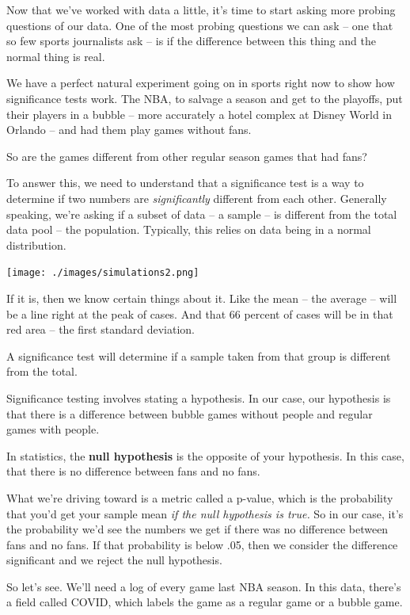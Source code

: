 \documentclass[
  letterpaper,
  DIV=11,
  numbers=noendperiod]{scrreprt}
\begin{document}
Now that we've worked with data a little, it's time to start asking more
probing questions of our data. One of the most probing questions we can
ask -- one that so few sports journalists ask -- is if the difference
between this thing and the normal thing is real.

We have a perfect natural experiment going on in sports right now to
show how significance tests work. The NBA, to salvage a season and get
to the playoffs, put their players in a bubble -- more accurately a
hotel complex at Disney World in Orlando -- and had them play games
without fans.

So are the games different from other regular season games that had
fans?

To answer this, we need to understand that a significance test is a way
to determine if two numbers are \emph{significantly} different from each
other. Generally speaking, we're asking if a subset of data -- a sample
-- is different from the total data pool -- the population. Typically,
this relies on data being in a normal distribution.

\texttt{[image: ./images/simulations2.png]}

If it is, then we know certain things about it. Like the mean -- the
average -- will be a line right at the peak of cases. And that 66
percent of cases will be in that red area -- the first standard
deviation.

A significance test will determine if a sample taken from that group is
different from the total.

Significance testing involves stating a hypothesis. In our case, our
hypothesis is that there is a difference between bubble games without
people and regular games with people.

In statistics, the \textbf{null hypothesis} is the opposite of your
hypothesis. In this case, that there is no difference between fans and
no fans.

What we're driving toward is a metric called a p-value, which is the
probability that you'd get your sample mean \emph{if the null hypothesis
is true.} So in our case, it's the probability we'd see the numbers we
get if there was no difference between fans and no fans. If that
probability is below .05, then we consider the difference significant
and we reject the null hypothesis.

So let's see. We'll need a log of every game last NBA season. In this
data, there's a field called COVID, which labels the game as a regular
game or a bubble game.
\end{document}
